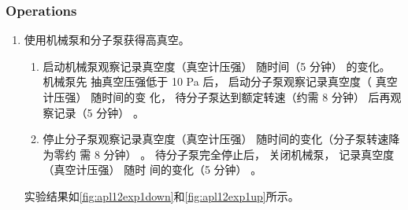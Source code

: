 \subsubsection{Operations}
\begin{enumerate}
	\item 使用机械泵和分子泵获得高真空。 
	\begin{enumerate}
		\item 启动机械泵观察记录真空度（真空计压强） 随时间（5 分钟） 的变化。 机械泵先
		抽真空压强低于 10 Pa 后， 启动分子泵观察记录真空度（ 真空计压强） 随时间的变
		化， 待分子泵达到额定转速（约需 8 分钟） 后再观察记录（5 分钟） 。
		\item 停止分子泵观察记录真空度（真空计压强） 随时间的变化（分子泵转速降为零约
		需 8 分钟） 。 待分子泵完全停止后， 关闭机械泵， 记录真空度（真空计压强） 随时
		间的变化（5 分钟） 。
	\end{enumerate}
	
	实验结果如\cref{fig:apl12exp1down}和\cref{fig:apl12exp1up}所示。
	

\end{enumerate}
